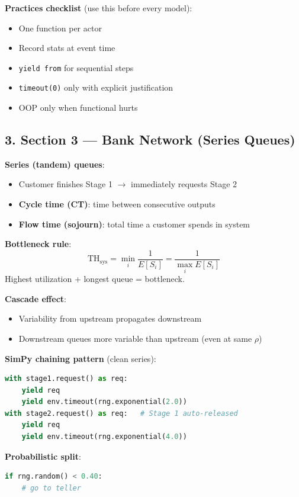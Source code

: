 \documentclass[11pt]{article}
\begin{document}
\textbf{Practices checklist} (use this before every model):
\begin{itemize}[leftmargin=*]
\item One function per actor
\item Record stats at event time
\item \texttt{yield from} for sequential steps
\item \texttt{timeout(0)} only with explicit justification
\item OOP only when functional hurts
\end{itemize}

\subsection*{3. Section 3 --- Bank Network (Series Queues)}

\textbf{Series (tandem) queues}:
\begin{itemize}[leftmargin=*]
\item Customer finishes Stage 1 $\rightarrow$ immediately requests Stage 2
\item \textbf{Cycle time (CT)}: time between consecutive outputs
\item \textbf{Flow time (sojourn)}: total time a customer spends in system
\end{itemize}

\textbf{Bottleneck rule}:
\[
\text{TH}_{\text{sys}} = \min_i \frac{1}{E[S_i]} = \frac{1}{\max_i E[S_i]}
\]
Highest utilization + longest queue = bottleneck.

\textbf{Cascade effect}:
\begin{itemize}[leftmargin=*]
\item Variability from upstream propagates downstream
\item Downstream queues more variable than upstream (even at same $\rho$)
\end{itemize}

\textbf{SimPy chaining pattern} (clean series):
\begin{lstlisting}[language=Python]
with stage1.request() as req:
    yield req
    yield env.timeout(rng.exponential(2.0))
with stage2.request() as req:   # Stage 1 auto-released
    yield req
    yield env.timeout(rng.exponential(4.0))
\end{lstlisting}

\textbf{Probabilistic split}:
\begin{lstlisting}[language=Python]
if rng.random() < 0.40:
    # go to teller
\end{lstlisting}
\end{document}
